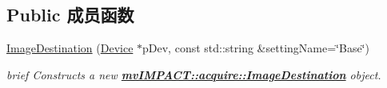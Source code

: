 \subsection*{Public 成员函数}
\begin{DoxyCompactItemize}
\item 
\hyperlink{classmv_i_m_p_a_c_t_1_1acquire_1_1_image_destination_a1ccdf12b3e0069dccabc017bb9d0c34e}{Image\+Destination} (\hyperlink{classmv_i_m_p_a_c_t_1_1acquire_1_1_device}{Device} $\ast$p\+Dev, const std\+::string \&setting\+Name=\char`\"{}Base\char`\"{})
\begin{DoxyCompactList}\small\item\em brief Constructs a new {\bfseries \hyperlink{classmv_i_m_p_a_c_t_1_1acquire_1_1_image_destination}{mv\+I\+M\+P\+A\+C\+T\+::acquire\+::\+Image\+Destination}} object. \end{DoxyCompactList}\end{DoxyCompactItemize}
